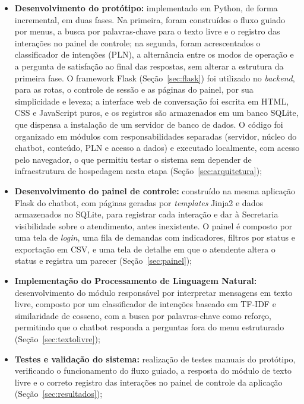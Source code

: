 \documentclass[12pt]{article}
\begin{document}
\begin{itemize}
  \item \textbf{Desenvolvimento do protótipo:} implementado em Python, de
forma incremental, em duas fases. Na primeira, foram construídos o fluxo
guiado por menus, a busca por palavras-chave para o texto livre e o
registro das interações no painel de controle; na segunda, foram
acrescentados o classificador de intenções (PLN), a alternância entre os
modos de operação e a pergunta de satisfação ao final das respostas, sem
alterar a estrutura da primeira fase. O framework Flask
(Seção~\ref{sec:flask}) foi utilizado no \textit{backend}, para as rotas,
o controle de sessão e as páginas do painel, por sua simplicidade e
leveza; a interface web de conversação foi escrita em HTML, CSS e
JavaScript puros, e os registros são armazenados em um banco SQLite, que
dispensa a instalação de um servidor de banco de dados. O código foi
organizado em módulos com responsabilidades separadas (servidor, núcleo do
chatbot, conteúdo, PLN e acesso a dados) e executado localmente, com
acesso pelo navegador, o que permitiu testar o sistema sem depender de
infraestrutura de hospedagem nesta etapa (Seção~\ref{sec:arquitetura});
  \item \textbf{Desenvolvimento do painel de controle:} construído na mesma aplicação Flask do chatbot, com páginas geradas por \textit{templates} Jinja2 e dados armazenados no SQLite, para registrar cada interação e dar à Secretaria visibilidade sobre o atendimento, antes inexistente. O painel é composto por uma tela de \textit{login}, uma fila de demandas com indicadores, filtros por status e exportação em CSV, e uma tela de detalhe em que o atendente altera o status e registra um parecer (Seção~\ref{sec:painel});

  \item \textbf{Implementação do Processamento de Linguagem Natural:}
  desenvolvimento do módulo responsável por interpretar mensagens em texto livre, composto por um classificador de intenções baseado em TF-IDF e similaridade de cosseno, com a busca por palavras-chave como reforço, permitindo que o chatbot responda a perguntas fora do menu estruturado (Seção~\ref{sec:textolivre});

  \item \textbf{Testes e validação do sistema:} realização de testes
  manuais do protótipo, verificando o funcionamento do fluxo guiado, a
  resposta do módulo de texto livre e o correto registro das interações
  no painel de controle da aplicação (Seção~\ref{sec:resultados});


\end{itemize}
\end{document}
